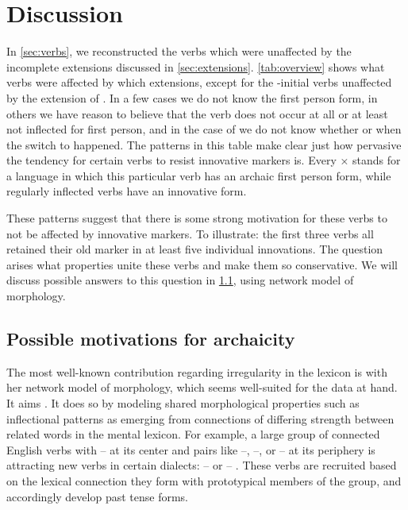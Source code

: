 \section{Discussion}
\label{sec:discussion}
In \cref{sec:verbs}, we reconstructed the verbs which were unaffected by the incomplete extensions discussed in \cref{sec:extensions}.
\cref{tab:overview} shows what verbs were affected by which extensions, except for the -initial \akuriyo verbs unaffected by the extension of .
In a few cases we do not know the first person form, in others we have reason to believe that the verb does not occur at all or at least not inflected for first person, and in the case of  we do not know whether or when the switch to  happened.
The patterns in this table make clear just how pervasive the tendency for certain verbs to resist innovative markers is.
Every × stands for a language in which this particular  verb has an archaic first person form, while regularly inflected  verbs have an innovative form.



These patterns suggest that there is some strong motivation for these verbs to not be affected by innovative markers.
To illustrate: the first three verbs all retained their old marker in at least five individual innovations.
The question arises what properties unite these verbs and make them so conservative.
We will discuss possible answers to this question in \cref{sec:motivations}, using  network model of morphology.

\subsection{Possible motivations for archaicity}
\label{sec:motivations}
The most well-known contribution regarding irregularity in the lexicon is \textcite{bybee1985morphology} with her network model of morphology, which seems well-suited for the data at hand.
It aims  \parencite[428]{bybee1995regular}.
It does so by modeling shared morphological properties such as inflectional patterns as emerging from connections of differing strength between related words in the mental lexicon.
For example, a large group of connected  English verbs with -- at its center and pairs like --, --, or -- at its periphery is attracting new verbs in certain dialects: -- or -- \parencite[129--130]{bybee1985morphology}.
These verbs are recruited based on the lexical connection they form with prototypical members of the group, and accordingly develop  past tense forms.

